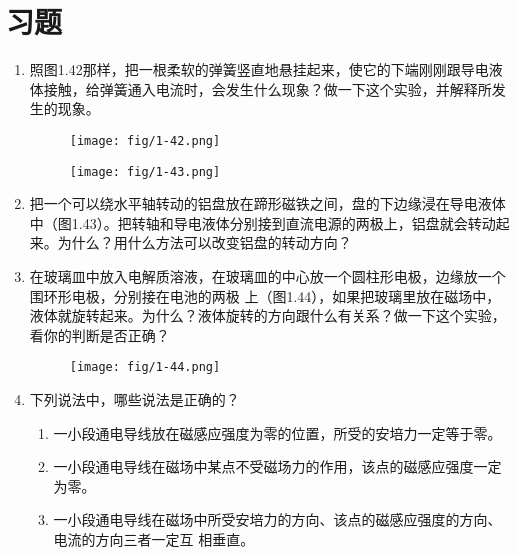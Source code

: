 \section*{习题}
\begin{enumerate}
    \item 照图1.42那样，把一根柔软的弹簧竖直地悬挂起来，使它的下端刚刚跟导电液体接触，给弹簧通入电流时，会发生什么现象？做一下这个实验，并解释所发生的现象。
    \begin{figure}[htp]\centering
    	\texttt{[image: fig/1-42.png]}
    	\caption{ }
    \end{figure}
\begin{figure}[htp]\centering
	\texttt{[image: fig/1-43.png]}
	\caption{ }
\end{figure}
    \item 把一个可以绕水平轴转动的铝盘放在蹄形磁铁之间，盘的下边缘浸在导电液体中（图1.43）。把转轴和导电液体分别接到直流电源的两极上，铝盘就会转动起来。为什么？用什么方法可以改变铝盘的转动方向？
\item 在玻璃皿中放入电解质溶液，在玻璃皿的中心放一个圆柱形电极，边缘放一个围环形电极，分别接在电池的两极
上（图1.44），如果把玻璃里放在磁场中，液体就旋转起来。为什么？液体旋转的方向跟什么有关系？做一下这个实验，看你的判断是否正确？
\begin{figure}[htp]\centering
	\texttt{[image: fig/1-44.png]}
	\caption{ }
\end{figure}
\item 下列说法中，哪些说法是正确的？
\begin{enumerate}
    \item 一小段通电导线放在磁感应强度为零的位置，所受的安培力一定等于零。
    \item 一小段通电导线在磁场中某点不受磁场力的作用，该点的磁感应强度一定为零。
    \item 一小段通电导线在磁场中所受安培力的方向、该点的磁感应强度的方向、电流的方向三者一定互
相垂直。
\end{enumerate}


\end{enumerate}
